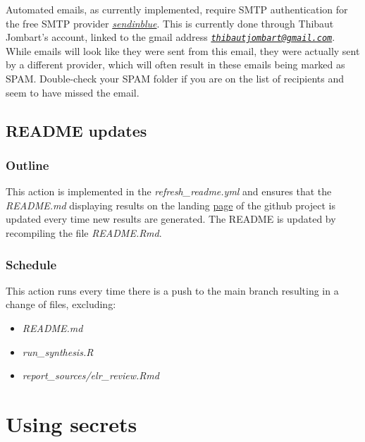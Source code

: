 \documentclass[]{book}
\providecommand{\tightlist}{%
  \setlength{\itemsep}{0pt}\setlength{\parskip}{0pt}}
\begin{document}
Automated emails, as currently implemented, require SMTP authentication for the
free SMTP provider \href{https://www.sendinblue.com/}{\emph{sendinblue}}. This is
currently done through Thibaut Jombart's account, linked to the gmail address
\emph{\href{mailto:thibautjombart@gmail.com}{\nolinkurl{thibautjombart@gmail.com}}}. While emails will look like they were sent from
this email, they were actually sent by a different provider, which will often
result in these emails being marked as SPAM. Double-check your SPAM folder if
you are on the list of recipients and seem to have missed the email.

\hypertarget{readme-updates}{%
\subsection{README updates}\label{readme-updates}}

\hypertarget{outline-3}{%
\subsubsection{Outline}\label{outline-3}}

This action is implemented in the \emph{refresh\_readme.yml} and ensures that the
\emph{README.md} displaying results on the landing
\href{https://github.com/whocov/trend_analysis_public}{page} of the github project is
updated every time new results are generated. The README is updated by
recompiling the file \emph{README.Rmd}.

\hypertarget{schedule-3}{%
\subsubsection{Schedule}\label{schedule-3}}

This action runs every time there is a push to the main branch resulting in a
change of files, excluding:

\begin{itemize}
\tightlist
\item
  \emph{README.md}
\item
  \emph{run\_synthesis.R}
\item
  \emph{report\_sources/elr\_review.Rmd}
\end{itemize}

\hypertarget{using-secrets}{%
\section{Using secrets}\label{using-secrets}}
\end{document}
